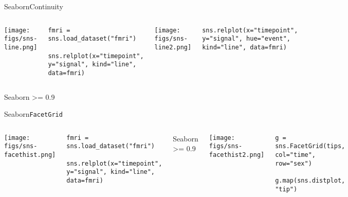 \documentclass[10pt,compress]{beamer} %
\begin{document}
\begin{frame}[fragile]{Seaborn}{Continuity}
	\begin{columns}
		\texttt{[image: figs/sns-line.png]}\\
		\begin{exampleblock}{\footnotesize{}}
		\vspace{-0.2cm} 
		\begin{lstlisting}[basicstyle=\tiny]
		fmri = sns.load_dataset("fmri")
		sns.relplot(x="timepoint", y="signal", kind="line", data=fmri)
		\end{lstlisting}
		\vspace{-0.2cm} 
		\end{exampleblock}

		\texttt{[image: figs/sns-line2.png]}\\
		\begin{exampleblock}{\footnotesize{}}
		\vspace{-0.2cm} 
		\begin{lstlisting}[basicstyle=\tiny]
		sns.relplot(x="timepoint", y="signal", hue="event", kind="line", data=fmri)
		\end{lstlisting}
		\vspace{-0.2cm} 
		\end{exampleblock}
	\end{columns}
	Seaborn >= 0.9
\end{frame}

\begin{frame}[fragile]{Seaborn}{\texttt{FacetGrid}}
	\begin{columns}
		\texttt{[image: figs/sns-facethist.png]}\\
		\begin{exampleblock}{\footnotesize{}}
		\vspace{-0.2cm} 
		\begin{lstlisting}[basicstyle=\tiny]
		fmri = sns.load_dataset("fmri")
		sns.relplot(x="timepoint", y="signal", kind="line", data=fmri)
		\end{lstlisting}
		\vspace{-0.2cm} 
		\end{exampleblock}

		Seaborn >= 0.9

 	\column{0.5\textwidth}
		\texttt{[image: figs/sns-facethist2.png]}\\
		\begin{exampleblock}{\footnotesize{}}
		\vspace{-0.2cm} 
		\begin{lstlisting}[basicstyle=\tiny]
		g = sns.FacetGrid(tips, col="time", row="sex")
		g.map(sns.distplot, "tip")
		\end{lstlisting}
		\vspace{-0.2cm} 
		\end{exampleblock}
	\end{columns}
\end{frame}
\end{document}
